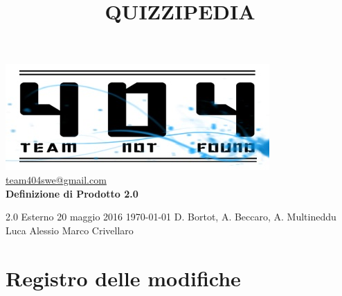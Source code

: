 \documentclass[a4paper,11pt]{article}
\title{\textbf{{\fontsize{8mm}{5mm}\selectfont QUIZZIPEDIA}}}
\date{}
\author{}
\begin{document}
	\maketitle
	\thispagestyle{empty}
	\begin{center}	
	\includegraphics{../team_not_found.jpg}\\
	\fontsize{5mm}{3mm}\url{team404swe@gmail.com}\\
	
	\vspace{50mm}
	\textbf{Definizione di Prodotto 2.0}
	\end{center}
			{2.0} 							%
			{Esterno} 						%
			{20 maggio 2016} 				%
			{\today} 						%
			{D. Bortot, A. Beccaro, A. Multineddu}		%
			{Luca Alessio} 			%
			{Marco Crivellaro} 				%
	\newpage
	\thispagestyle{empty}
	\null  

	\newpage
	\newpage
	\fancyfoot[R]{\thepage}
	
	\hspace{30 mm}
	\section*{Registro delle modifiche}
	
	\beginregistro
	
\end{document}
